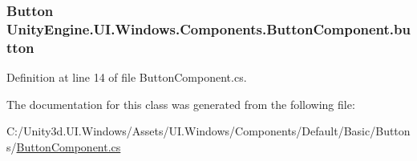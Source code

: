 \subsubsection[{button}]{\setlength{\rightskip}{0pt plus 5cm}Button Unity\+Engine.\+U\+I.\+Windows.\+Components.\+Button\+Component.\+button\hspace{0.3cm}{\ttfamily [protected]}}\label{class_unity_engine_1_1_u_i_1_1_windows_1_1_components_1_1_button_component_ac4ebb18319ef5e3875489fdb6888cc6a}


Definition at line 14 of file Button\+Component.\+cs.



The documentation for this class was generated from the following file\+:\begin{DoxyCompactItemize}
\item 
C\+:/\+Unity3d.\+U\+I.\+Windows/\+Assets/\+U\+I.\+Windows/\+Components/\+Default/\+Basic/\+Buttons/\hyperlink{_button_component_8cs}{Button\+Component.\+cs}\end{DoxyCompactItemize}
